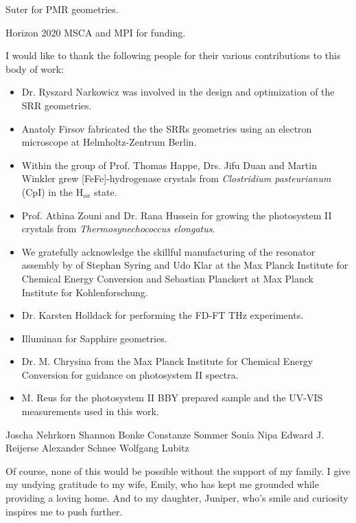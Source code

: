 
Suter for PMR geometries. 

Horizon 2020 MSCA and MPI for funding. 

I would like to thank the following people for their various contributions to this body of work:
\begin{itemize}
    \item Dr. Ryszard Narkowicz was involved in the design and optimization of the SRR geometries. 
    \item Anatoly Firsov fabricated the the SRRs geometries using an electron microscope at Helmholtz-Zentrum Berlin. 
    \item Within the group of Prof. Thomas Happe, Drs. Jifu Duan and Martin Winkler grew [FeFe]-hydrogenase crystals from {\em Clostridium pasteurianum} (CpI) in the H$_{ox}$ state.
    \item Prof. Athina Zouni and Dr. Rana Hussein for growing the photosystem II crystals from {\em Thermosynechococcus elongatus}. 
    \item We gratefully acknowledge the skillful manufacturing of the resonator assembly by of Stephan Syring and Udo Klar at the Max Planck Institute for Chemical Energy Conversion and Sebastian Planckert at Max Planck Institute for Kohlenforschung.
    \item Dr. Karsten Holldack for performing the FD-FT THz experiments.
    \item Illuminau for Sapphire geometries.
    \item Dr. M. Chrysina from the Max Planck Institute for Chemical Energy Conversion for guidance on photosystem II spectra.
    \item M. Reus for the photosystem II BBY prepared sample and the UV-VIS measurements used in this work. 
\end{itemize}

Joscha Nehrkorn
Shannon Bonke
Constanze Sommer
Sonia 
Nipa 
Edward J. Reijerse
Alexander Schnee
Wolfgang Lubitz


Of course, none of this would be possible without the support of my family. I give my undying gratitude to my wife, Emily, who has kept me grounded while providing a loving home. And to my daughter, Juniper, who's smile and curiosity inspires me to push further.
 